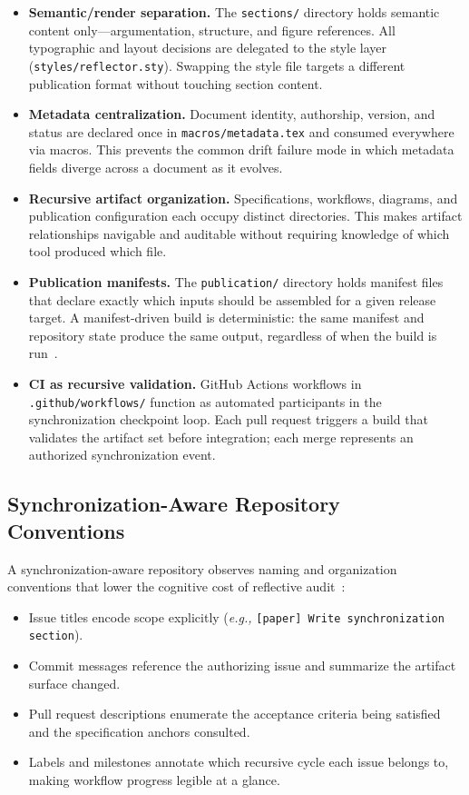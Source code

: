 \begin{itemize}
  \item \textbf{Semantic/render separation.} The \texttt{sections/} directory holds semantic content only---argumentation, structure, and figure references. All typographic and layout decisions are delegated to the style layer (\texttt{styles/reflector.sty}). Swapping the style file targets a different publication format without touching section content.

  \item \textbf{Metadata centralization.} Document identity, authorship, version, and status are declared once in \texttt{macros/metadata.tex} and consumed everywhere via macros. This prevents the common drift failure mode in which metadata fields diverge across a document as it evolves.

  \item \textbf{Recursive artifact organization.} Specifications, workflows, diagrams, and publication configuration each occupy distinct directories. This makes artifact relationships navigable and auditable without requiring knowledge of which tool produced which file.

  \item \textbf{Publication manifests.} The \texttt{publication/} directory holds manifest files that declare exactly which inputs should be assembled for a given release target. A manifest-driven build is deterministic: the same manifest and repository state produce the same output, regardless of when the build is run~\cite{Vogels2009EventuallyConsistent}.

  \item \textbf{CI as recursive validation.} GitHub Actions workflows in \texttt{.github/workflows/} function as automated participants in the synchronization checkpoint loop. Each pull request triggers a build that validates the artifact set before integration; each merge represents an authorized synchronization event.
\end{itemize}

\subsection{Synchronization-Aware Repository Conventions}

A synchronization-aware repository observes naming and organization conventions that lower the cognitive cost of reflective audit~\cite{Simon1957ModelsMan}:
\begin{itemize}
  \item Issue titles encode scope explicitly (\textit{e.g.,} \texttt{[paper] Write synchronization section}).
  \item Commit messages reference the authorizing issue and summarize the artifact surface changed.
  \item Pull request descriptions enumerate the acceptance criteria being satisfied and the specification anchors consulted.
  \item Labels and milestones annotate which recursive cycle each issue belongs to, making workflow progress legible at a glance.
\end{itemize}

